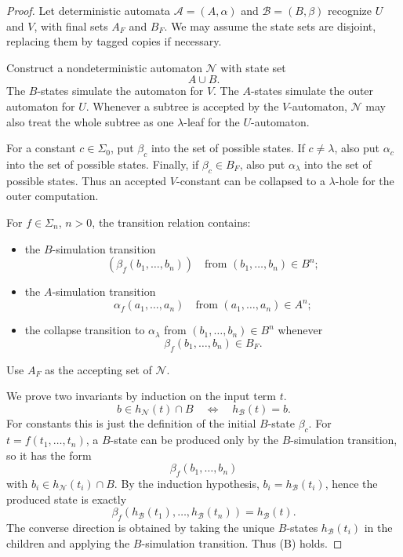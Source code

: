 \documentclass[11pt]{article}
\theoremstyle{definition}
\newcommand{\SigmaSym}{\Sigma}
\newcommand{\Aut}{\mathcal A}
\begin{document}
\begin{proof}
Let deterministic automata \(\Aut=(A,\alpha)\) and \(\mathcal B=(B,\beta)\)
recognize \(U\) and \(V\), with final sets \(A_F\) and \(B_F\).  We may assume
the state sets are disjoint, replacing them by tagged copies if necessary.

Construct a nondeterministic automaton \(\mathcal N\) with state set
\[
  A\cup B.
\]
The \(B\)-states simulate the automaton for \(V\).  The \(A\)-states simulate
the outer automaton for \(U\).  Whenever a subtree is accepted by the
\(V\)-automaton, \(\mathcal N\) may also treat the whole subtree as one
\(\lambda\)-leaf for the \(U\)-automaton.

For a constant \(c\in\SigmaSym_0\), put \(\beta_c\) into the set of possible
states.  If \(c\ne\lambda\), also put \(\alpha_c\) into the set of possible
states.  Finally, if \(\beta_c\in B_F\), also put \(\alpha_\lambda\) into the
set of possible states.  Thus an accepted \(V\)-constant can be collapsed to a
\(\lambda\)-hole for the outer computation.

For \(f\in\SigmaSym_n\), \(n>0\), the transition relation contains:
\begin{itemize}[leftmargin=*]
  \item the \(B\)-simulation transition
  \[
    (\beta_f(b_1,\ldots,b_n))
    \quad\text{from }(b_1,\ldots,b_n)\in B^n;
  \]
  \item the \(A\)-simulation transition
  \[
    \alpha_f(a_1,\ldots,a_n)
    \quad\text{from }(a_1,\ldots,a_n)\in A^n;
  \]
  \item the collapse transition to \(\alpha_\lambda\) from
  \((b_1,\ldots,b_n)\in B^n\) whenever
  \[
    \beta_f(b_1,\ldots,b_n)\in B_F.
  \]
\end{itemize}
Use \(A_F\) as the accepting set of \(\mathcal N\).

We prove two invariants by induction on the input term \(t\).
\[
  b\in h_{\mathcal N}(t)\cap B
  \quad\Longleftrightarrow\quad
  h_{\mathcal B}(t)=b.                       \tag{B}
\]
For constants this is just the definition of the initial \(B\)-state
\(\beta_c\).  For \(t=f(t_1,\ldots,t_n)\), a \(B\)-state can be produced only
by the \(B\)-simulation transition, so it has the form
\[
  \beta_f(b_1,\ldots,b_n)
\]
with \(b_i\in h_{\mathcal N}(t_i)\cap B\).  By the induction hypothesis,
\(b_i=h_{\mathcal B}(t_i)\), hence the produced state is exactly
\[
  \beta_f(h_{\mathcal B}(t_1),\ldots,h_{\mathcal B}(t_n))
  =
  h_{\mathcal B}(t).
\]
The converse direction is obtained by taking the unique \(B\)-states
\(h_{\mathcal B}(t_i)\) in the children and applying the \(B\)-simulation
transition.  Thus (B) holds.


\end{proof}
\end{document}
